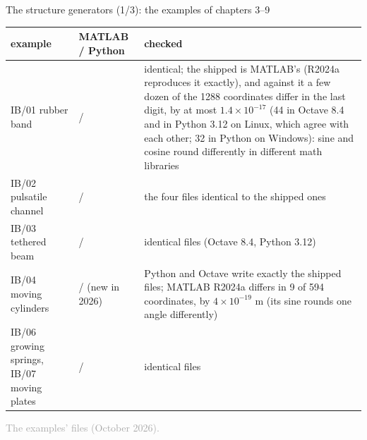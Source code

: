 \documentclass[aspectratio=169,11pt]{beamer}
\newcommand{\sourcecredit}[1]{\vfill\begin{flushright}\tiny\textcolor{DarkGray}{#1}\end{flushright}}
\begin{document}
\begin{frame}{The structure generators (1/3): the examples of chapters 3--9}
\label{fr:gen1}
\scriptsize
\renewcommand{\arraystretch}{1.0}
\begin{tabular}{@{}L{0.18\textwidth}L{0.27\textwidth}L{0.48\textwidth}@{}}
\toprule
example & MATLAB / Python & checked \\
\midrule
IB/01 rubber band &  /  &  identical; the shipped  is MATLAB's (R2024a reproduces it exactly), and against it a few dozen of the 1288 coordinates differ in the last digit, by at most $1.4\times10^{-17}$ (44 in Octave 8.4 and in Python 3.12 on Linux, which agree with each other; 32 in Python on Windows): sine and cosine round differently in different math libraries \\
IB/02 pulsatile channel &  /  & the four files identical to the shipped ones \\
IB/03 tethered beam &  /  & identical files (Octave 8.4, Python 3.12) \\
IB/04 moving cylinders &  /  (new in 2026) & Python and Octave write exactly the shipped files; MATLAB R2024a differs in 9 of 594 coordinates, by $4\times10^{-19}$ m (its sine rounds one angle differently) \\
IB/06 growing springs, IB/07 moving plates &  /  & identical files \\
\bottomrule
\end{tabular}
\sourcecredit{The examples'  files (October 2026).}
\end{frame}
\end{document}
